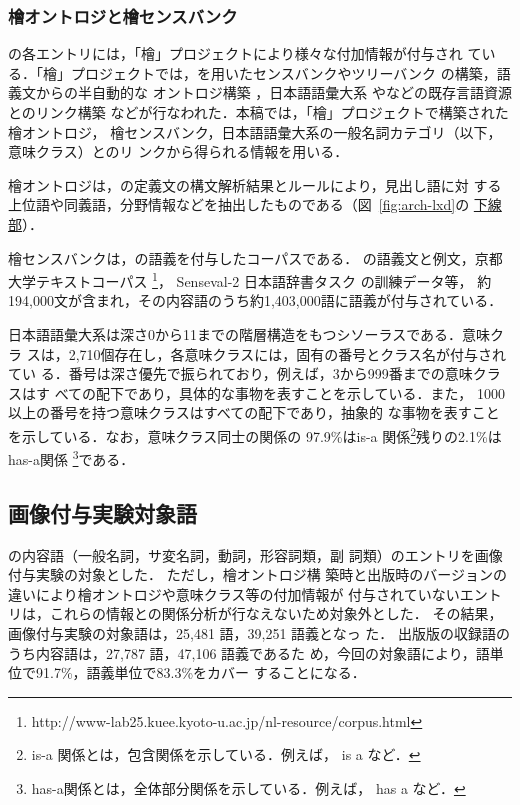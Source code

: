 \documentclass[japanese]{jnlp_1.4}
\newcommand{\izs}[1]{}
\newcommand{\lxd}{}
\newcommand{\WN}{}
\begin{document}
\subsubsection{檜オントロジと檜センスバンク} 

\lxd{}の各エントリには，「檜」プロジェクトにより様々な付加情報が付与され
ている．「檜」プロジェクトでは，\lxd{}を用いたセンスバンクやツリーバンク
の構築\cite{Bond:Fujita:Tanaka:2006}，語義文からの半自動的な
オントロジ構築\cite{Bond:Nichols:Fujita:Tanaka:2004}
，日本語語彙大系
\cite{GoiTaikeij}や\WN{}などの既存言語資源とのリンク構築\cite{Nichols:Bond:Tanaka:Fujita:Flickinger:2006}
などが行なわれた．本稿では，「檜」プロジェクトで構築された檜オントロジ，
檜センスバンク，日本語語彙大系の一般名詞カテゴリ（以下，意味クラス）とのリ
ンクから得られる情報を用いる．

檜オントロジは，\lxd{}の定義文の構文解析結果とルールにより，見出し語に対
する上位語や同義語，分野情報などを抽出したものである（図~\ref{fig:arch-lxd}の
\ul{下線部}）．

檜センスバンクは，\lxd{}の語義を付与したコーパスである．
\lxd{}の語義文と例文，京都大学テキストコーパス
\footnote{http://www-lab25.kuee.kyoto-u.ac.jp/nl-resource/corpus.html}，
Senseval-2 日本語辞書タスク \cite{Shirai:2003j}の訓練データ等，
約 194,000文が含まれ，その内容語のうち約1,403,000語に語義が付与されている．

日本語語彙大系は深さ0から11までの階層構造をもつシソーラスである．意味クラ
スは，2,710個存在し，各意味クラスには，固有の番号とクラス名が付与されてい
る．番号は深さ優先で振られており，例えば，3から999番までの意味クラスはす
べて\izs{2:具体}の配下であり，具体的な事物を表すことを示している．また，
1000以上の番号を持つ意味クラスはすべて\izs{1000:抽象}の配下であり，抽象的
な事物を表すことを示している．なお，意味クラス同士の関係の 97.9\%はis-a
関係\footnote{is-a 関係とは，包含関係を示している．例えば，
\izs{531:星} is a \izs{527:天体}など．}残りの2.1\%はhas-a関係
\footnote{has-a関係とは，全体部分関係を示している．例えば，
\izs{0555:顔} has a \izs{0571:耳}など．}である．


\subsection{画像付与実験対象語} \label{sec:all-lxd-target}

\lxd{}の内容語（一般名詞，サ変名詞，動詞，形容詞類，副
詞類）のエントリを画像付与実験の対象とした．
ただし，檜オントロジ構
築時と出版時のバージョンの違いにより檜オントロジや意味クラス等の付加情報が
付与されていないエントリは，これらの情報との関係分析が行なえないため対象外とした．
その結果，画像付与実験の対象語は，25,481 語，39,251 語義となっ
た．
\lxd{}出版版の収録語のうち内容語は，27,787 語，47,106 語義であるた
め，今回の対象語により，語単位で91.7\%，語義単位で83.3\%をカバー
することになる．
\end{document}
